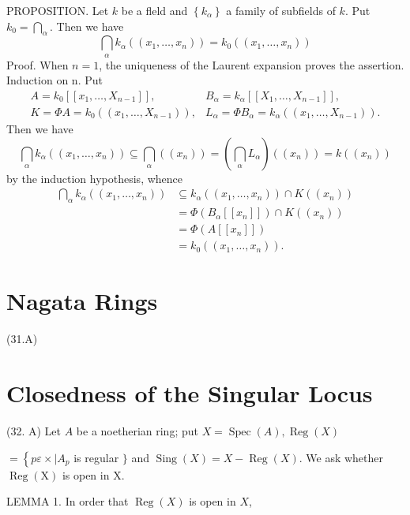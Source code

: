 PROPOSITION. Let $k$ be a fleld and $\left\{k_{\alpha}\right\}$ a family of subfields of $k$. Put $k_{0}=\bigcap_{\alpha}$. Then we have
$$
\bigcap_{\alpha} k_{\alpha}\left(\left(x_{1}, \ldots, x_{n}\right)\right)=k_{0}\left(\left(x_{1}, \ldots, x_{n}\right)\right)
$$
Proof. When $n=1$, the uniqueness of the Laurent expansion proves the assertion. Induction on $\mathrm{n}$. Put
$$
\begin{array}{ll}
A=k_{0}\left[\left[x_{1}, \ldots, X_{n-1}\right]\right], & B_{\alpha}=k_{\alpha}\left[\left[X_{1}, \ldots, X_{n-1}\right]\right], \\
K=\Phi A=k_{0}\left(\left(x_{1}, \ldots, X_{n-1}\right)\right), & L_{\alpha}=\Phi B_{\alpha}=k_{\alpha}\left(\left(x_{1}, \ldots, X_{n-1}\right)\right) .
\end{array}
$$
Then we have
$$
\bigcap_{\alpha} k_{\alpha}\left(\left(x_{1}, \ldots, x_{n}\right)\right) \subseteq \bigcap_{\alpha}\left(\left(x_{n}\right)\right)=\left(\bigcap_{\alpha} L_{\alpha}\right)\left(\left(x_{n}\right)\right)=k\left(\left(x_{n}\right)\right)
$$
by the induction hypothesis, whence
$$
\begin{aligned}
\bigcap_{\alpha} k_{\alpha}\left(\left(x_{1}, \ldots, x_{n}\right)\right) & \subseteq k_{\alpha}\left(\left(x_{1}, \ldots, x_{n}\right)\right) \cap K\left(\left(x_{n}\right)\right) \\
&=\Phi\left(B_{\alpha}\left[\left[x_{n}\right]\right]\right) \cap K\left(\left(x_{n}\right)\right) \\
&=\Phi\left(A\left[\left[x_{n}\right]\right]\right) \\
&=k_{0}\left(\left(x_{1}, \ldots, x_{n}\right)\right) .
\end{aligned}
$$

\section{Nagata Rings}
(31.A) 

\section{Closedness of the Singular Locus}
(32. A) Let $A$ be a noetherian ring; put $X=\operatorname{Spec}(A), \operatorname{Reg}(X)$

$=\left\{p \varepsilon \times \mid A_{p}\right.$ is regular $\}$ and $\operatorname{Sing}(X)=X-\operatorname{Reg}(X)$. We ask whether $\operatorname{Reg}(\mathrm{X})$ is open in $\mathrm{X}$.

LEMMA 1. In order that $\operatorname{Reg}(X)$ is open in $X$,

